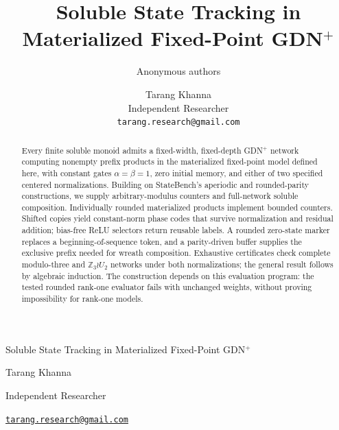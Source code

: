 \documentclass[10pt]{article}
\title{Soluble State Tracking in Materialized Fixed-Point GDN$^{+}$}
\author{Anonymous authors}
\author{Tarang Khanna\\
Independent Researcher\\
\texttt{tarang.research@gmail.com}}
\date{}
\theoremstyle{remark}
\newcommand{\Z}{\mathbb Z}
\begin{document}
\ifdefined\TMLRSubmission
  \maketitle
\else
  \vspace*{-1.5em}
  \begin{center}
    {\Large Soluble State Tracking in Materialized Fixed-Point GDN$^{+}$\par}
    \vspace{0.7em}
    {\normalsize Tarang Khanna\par}
    {\small Independent Researcher\par}
    {\small\href{mailto:tarang.research@gmail.com}{\texttt{tarang.research@gmail.com}}\par}
  \end{center}
  \vspace{0.35em}
\fi
\begingroup\renewcommand{\thefootnote}{*}\endgroup

\begin{abstract}
Every finite soluble monoid admits a fixed-width, fixed-depth GDN$^{+}$ network
computing nonempty prefix products in the materialized fixed-point model defined
here, with constant gates $\alpha=\beta=1$, zero initial memory, and either of
two specified centered normalizations. Building on StateBench's aperiodic and
rounded-parity constructions, we supply arbitrary-modulus counters and
full-network soluble composition. Individually rounded materialized products
implement bounded counters. Shifted copies yield constant-norm phase codes that
survive normalization and residual addition; bias-free ReLU selectors return
reusable labels. A rounded zero-state marker replaces a beginning-of-sequence
token, and a parity-driven buffer supplies the exclusive prefix needed for
wreath composition. Exhaustive certificates check complete modulo-three and
$\Z_3\wr U_2$ networks under both normalizations; the general result follows
by algebraic induction. The construction depends on this evaluation program:
the tested rounded rank-one evaluator fails with unchanged weights, without
proving impossibility for rank-one models.
\end{abstract}
\end{document}
